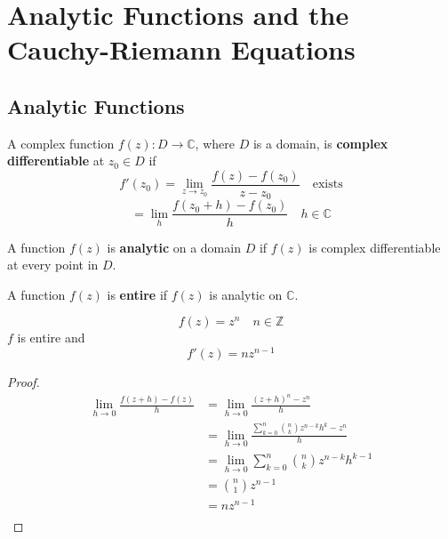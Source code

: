 \chapter{Analytic Functions and the Cauchy-Riemann Equations}

\section{Analytic Functions}

\begin{definition}
    A complex function $f(z): D \to \mathbb{C}$, where $D$ is a domain, is \textbf{complex differentiable} at $z_0 \in D$ if
    $$f'(z_0) = \lim_{z \to z_0} \frac{f(z) - f(z_0)}{z - z_0} \quad \text{exists}$$
    $$ = \lim_{h} \frac{f(z_0 + h) - f(z_0)}{h} \quad h \in \mathbb{C}$$
\end{definition}

\begin{definition}
    [Analytic]
    A function $f(z)$ is \textbf{analytic} on a domain $D$ if $f(z)$ is complex differentiable at every point in $D$.
\end{definition}

\begin{definition}
    [Entire]
    A function $f(z)$ is \textbf{entire} if $f(z)$ is analytic on $\mathbb{C}$.
\end{definition}

\begin{example}
    $$f(z) = z^n \quad n \in \mathbb{Z}$$
    $f$ is entire and
    $$f'(z) = nz^{n-1}$$
\end{example}
\begin{proof}
    \begin{align*}
        \lim_{h \to 0} \frac{f(z + h) - f(z)}{h} & = \lim_{h \to 0} \frac{(z + h)^n - z^n}{h}                               \\
                                                 & = \lim_{h \to 0} \frac{\sum_{k=0}^{n} \binom{n}{k} z^{n-k} h^k - z^n}{h} \\
                                                 & = \lim_{h \to 0} \sum_{k=0}^{n} \binom{n}{k} z^{n-k} h^{k-1}             \\
                                                 & = \binom{n}{1} z^{n-1}                                                   \\
                                                 & = nz^{n-1}                                                               \\
    \end{align*}
\end{proof}

